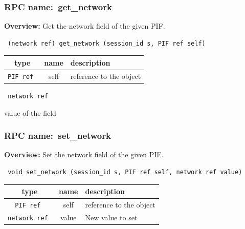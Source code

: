 \vspace{0.3cm}
\vspace{0.3cm}
\vspace{0.3cm}
\subsubsection{RPC name:~get\_network}

{\bf Overview:} 
Get the network field of the given PIF.

\begin{verbatim} (network ref) get_network (session_id s, PIF ref self)\end{verbatim}



 
\vspace{0.3cm}
\begin{tabular}{|c|c|p{7cm}|}
 \hline
{\bf type} & {\bf name} & {\bf description} \\ \hline
{\tt PIF ref } & self & reference to the object \\ \hline 

\end{tabular}

\vspace{0.3cm}

{\tt 
network ref
}


value of the field
\vspace{0.3cm}
\vspace{0.3cm}
\vspace{0.3cm}
\subsubsection{RPC name:~set\_network}

{\bf Overview:} 
Set the network field of the given PIF.

\begin{verbatim} void set_network (session_id s, PIF ref self, network ref value)\end{verbatim}



 
\vspace{0.3cm}
\begin{tabular}{|c|c|p{7cm}|}
 \hline
{\bf type} & {\bf name} & {\bf description} \\ \hline
{\tt PIF ref } & self & reference to the object \\ \hline 

{\tt network ref } & value & New value to set \\ \hline 

\end{tabular}

